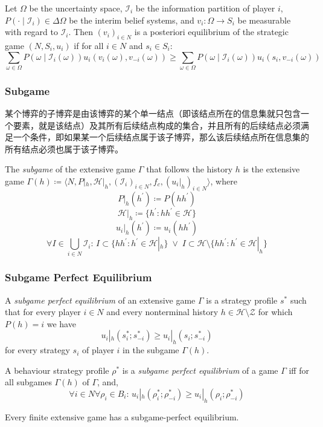 \documentclass[UTF8,11pt,colorlinks,compress,openany]{beamer}%
\begin{document}
\begin{frame}\frametitle{}
Let $\Omega$ be the uncertainty space, $\mathcal{I}_i$ be the information partition of player $i$, $P(\cdot\mid\mathcal{I}_i)\in\Delta\Omega$ be the interim belief systems, and $v_i: \Omega \to S_i$ be measurable with regard to $\mathcal{I}_i$. Then $(v_i)_{i\in N}$ is a posteriori equilibrium of the strategic game $(N,S_i,u_i)$ if for all $i\in N$ and $s_i\in S_i$:
\[\sum_{\omega \in \Omega}P(\omega\mid\mathcal{I}_i(\omega))u_i(v_i(\omega ),v_{-i}(\omega))\geq\sum_{\omega \in \Omega}P(\omega\mid\mathcal{I}_i(\omega))u_i\left(s_i,v_{-i}(\omega)\right)\]
\end{frame}

\begin{frame}\frametitle{Subgame}
某个博弈的子博弈是由该博弈的某个单一结点（即该结点所在的信息集就只包含一个要素，就是该结点）及其所有后续结点构成的集合，并且所有的后续结点必须满足一个条件，即如果某一个后续结点属于该子博弈，那么该后续结点所在信息集的所有结点必须也属于该子博弈。
\begin{definition}[Subgame]
	The \emph{subgame} of the extensive game $\Gamma$ that follows the history $h$
	is the extensive game $\Gamma(h)\coloneqq \langle N,P|_h,\mathcal{H}|_h,(\mathcal{I}_i)_{i\in N},f_c,(u_i|_h)_{i\in N}\rangle$, where
	\[P|_h(h^\prime)\coloneqq P(hh^\prime)\]
	\[\mathcal{H}|_h\coloneqq \{h^\prime:hh^\prime\in\mathcal{H}\}\]
	\[u_i|_h(h^\prime)\coloneqq u_i(hh^\prime)\]
	\[\forall I\in\bigcup\limits_{i\in N}\mathcal{I}_i:\,I\subset\{hh^\prime:h^\prime\in\mathcal{H}|_h\}\;\vee\;I\subset\mathcal{H}\setminus \{hh^\prime:h^\prime\in\mathcal{H}|_h\}\]
\end{definition}	
\end{frame}

\begin{frame}\frametitle{Subgame Perfect Equilibrium}
\begin{definition}
	A \emph{subgame perfect equilibrium} of an extensive game $\Gamma$ is a strategy profile $s^*$ such that for every player $i\in N$ and every nonterminal history $h\in\mathcal{H}\setminus\mathcal{Z}$ for which $P(h)=i$ we have \[u_i|_h(s_i^*;s_{-i}^*)\geq u_i|_h(s_i;s_{-i}^*)\]
	for every strategy $s_i$ of player $i$ in the subgame $\Gamma(h)$.
	
	A behaviour strategy profile $\rho^*$ is a \emph{subgame perfect equilibrium} of a game $\Gamma$ iff for all subgames $\Gamma(h)$ of $\Gamma$, and,
	\[\forall i\in N\forall\rho_i\in B_i:\, u_i|_h(\rho_i^*;\rho_{-i}^*)\geq u_i|_h(\rho_i;\rho_{-i}^*)\]
\end{definition}
\begin{theorem}
Every finite extensive game has a subgame-perfect equilibrium.
\end{theorem}
\end{frame}
\end{document}
